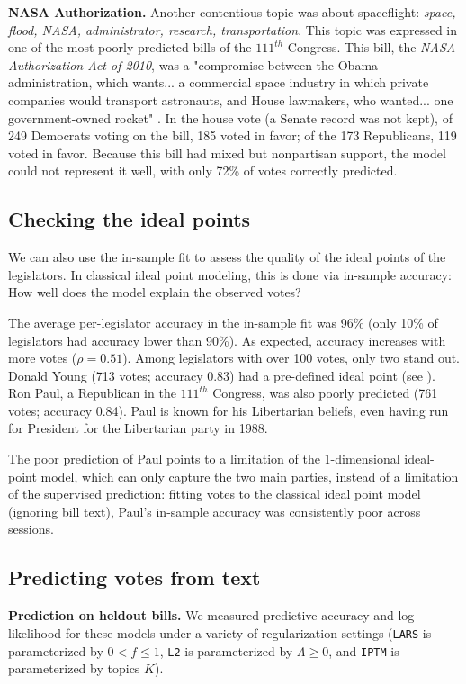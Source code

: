 \textbf{NASA Authorization.}
Another contentious topic was about spaceflight: \emph{space, flood,
NASA, administrator, research, transportation}.
This topic was expressed in one of the most-poorly predicted bills of
the $111^{th}$ Congress.  This bill, the \emph{NASA Authorization Act
of 2010}, was a "compromise between the Obama administration, which
wants... a commercial space industry in which private companies would
transport astronauts, and House lawmakers, who wanted... one
government-owned rocket" \cite{herszenhorn:2010}.  In the house vote
(a Senate record was not kept), of 249 Democrats voting on the bill,
185 voted in favor; of the 173 Republicans, 119 voted in favor.
Because this bill had mixed but nonpartisan support, the model could
not represent it well, with only 72\% of votes correctly predicted.

\subsection{Checking the ideal points}
We can also use the in-sample fit to assess the quality of the ideal
points of the legislators.  In classical ideal point modeling, this is
done via in-sample accuracy: How well does the model explain the
observed votes?

The average per-legislator accuracy in the in-sample fit was 96\%
(only 10\% of legislators had accuracy lower than 90\%).  As expected,
accuracy increases with more votes ($\rho=0.51$).  Among legislators
with over 100 votes, only two stand out. Donald Young (713 votes;
accuracy 0.83) had a pre-defined ideal point (see ). Ron
Paul, a Republican in the $111^{th}$ Congress, was also poorly
predicted (761 votes; accuracy 0.84).  Paul is known for his
Libertarian beliefs, even having run for President for the Libertarian
party in 1988.

The poor prediction of Paul points to a limitation of the
1-dimensional ideal-point model, which can only capture the two main
parties, instead of a limitation of the supervised prediction: fitting
votes to the classical ideal point model (ignoring bill text), Paul's
in-sample accuracy was consistently poor across sessions.

\subsection{Predicting votes from text}

\textbf{Prediction on heldout bills.}  We measured predictive accuracy
and log likelihood for these models under a variety of regularization
settings (\verb!LARS! is parameterized by $0 < f \le 1$, \verb!L2! is
parameterized by $\Lambda \ge 0$, and \verb!IPTM! is parameterized by
topics $K$).

